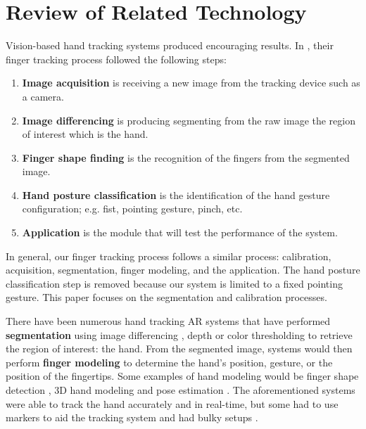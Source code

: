 \documentclass{acm_proc_article-sp}
\begin{document}
\section{Review of Related Technology}
Vision-based hand tracking systems \cite{HurstWolfgangVanWezel:2013, HurstWolfgangVriens:2013} produced encouraging results. In \cite{Hardenberg:2001}, their finger tracking process followed the following steps:

\begin{enumerate}
	\item \textbf{Image acquisition} is receiving a new image from the tracking device such as a camera.
	\item \textbf{Image differencing} is producing segmenting from the raw image the region of interest which is the hand.
	\item \textbf{Finger shape finding} is the recognition of the fingers from the segmented image. 
	\item \textbf{Hand posture classification} is the identification of the hand gesture configuration; e.g. fist, pointing gesture, pinch, etc.
	\item \textbf{Application} is the module that will test the performance of the system.
\end{enumerate}

In general, our finger tracking process follows a similar process: calibration, acquisition, segmentation, finger modeling, and the application. The hand posture classification step is removed because our system is limited to a fixed pointing gesture. This paper focuses on the segmentation and calibration processes.

There have been numerous hand tracking AR systems that have performed \textbf{segmentation} using image differencing \cite{Hardenberg:2001, Song:2008}, depth \cite{Kulshreshth:2013, Raheja:2011} or color thresholding \cite{Byron:2009, Gumpp:2006} to retrieve the region of interest: the hand. From the segmented image, systems would then perform \textbf{finger modeling} to determine the hand's position, gesture, or the position of the fingertips. Some examples of hand modeling would be finger shape detection \cite{Song:2008,Hardenberg:2001}, 3D hand modeling \cite{Byron:2009, Gumpp:2006} and pose estimation \cite{SchlattmannKahlesz:2007, Wang:2011}. The aforementioned systems were able to track the hand accurately and in real-time, but some had to use markers to aid the tracking system \cite{Chun:2013, Refinger:2007, Huynh:2009} and had bulky setups \cite{SchlattmannKahlesz:2007, Wang:2011}.
\end{document}
